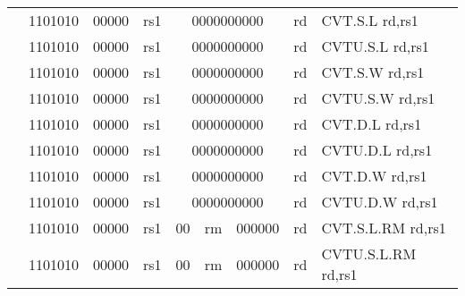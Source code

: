 \begin{table}[p]
\begin{small}
\begin{center}
\begin{tabular}{rcccccccccccl}
&
\multicolumn{2}{|c|}{1101010} &
\multicolumn{1}{c|}{00000} &
\multicolumn{1}{c|}{rs1} &
\multicolumn{6}{c|}{0000000000} &
\multicolumn{1}{c|}{rd} & CVT.S.L rd,rs1 \\
\cline{2-12}
  

&
\multicolumn{2}{|c|}{1101010} &
\multicolumn{1}{c|}{00000} &
\multicolumn{1}{c|}{rs1} &
\multicolumn{6}{c|}{0000000000} &
\multicolumn{1}{c|}{rd} & CVTU.S.L rd,rs1 \\
\cline{2-12}
  

&
\multicolumn{2}{|c|}{1101010} &
\multicolumn{1}{c|}{00000} &
\multicolumn{1}{c|}{rs1} &
\multicolumn{6}{c|}{0000000000} &
\multicolumn{1}{c|}{rd} & CVT.S.W rd,rs1 \\
\cline{2-12}
  

&
\multicolumn{2}{|c|}{1101010} &
\multicolumn{1}{c|}{00000} &
\multicolumn{1}{c|}{rs1} &
\multicolumn{6}{c|}{0000000000} &
\multicolumn{1}{c|}{rd} & CVTU.S.W rd,rs1 \\
\cline{2-12}
  

&
\multicolumn{2}{|c|}{1101010} &
\multicolumn{1}{c|}{00000} &
\multicolumn{1}{c|}{rs1} &
\multicolumn{6}{c|}{0000000000} &
\multicolumn{1}{c|}{rd} & CVT.D.L rd,rs1 \\
\cline{2-12}
  

&
\multicolumn{2}{|c|}{1101010} &
\multicolumn{1}{c|}{00000} &
\multicolumn{1}{c|}{rs1} &
\multicolumn{6}{c|}{0000000000} &
\multicolumn{1}{c|}{rd} & CVTU.D.L rd,rs1 \\
\cline{2-12}
  

&
\multicolumn{2}{|c|}{1101010} &
\multicolumn{1}{c|}{00000} &
\multicolumn{1}{c|}{rs1} &
\multicolumn{6}{c|}{0000000000} &
\multicolumn{1}{c|}{rd} & CVT.D.W rd,rs1 \\
\cline{2-12}
  

&
\multicolumn{2}{|c|}{1101010} &
\multicolumn{1}{c|}{00000} &
\multicolumn{1}{c|}{rs1} &
\multicolumn{6}{c|}{0000000000} &
\multicolumn{1}{c|}{rd} & CVTU.D.W rd,rs1 \\
\cline{2-12}
  

&
\multicolumn{2}{|c|}{1101010} &
\multicolumn{1}{c|}{00000} &
\multicolumn{1}{c|}{rs1} &
\multicolumn{1}{c|}{00} &
\multicolumn{2}{c|}{rm} &
\multicolumn{3}{c|}{000000} &
\multicolumn{1}{c|}{rd} & CVT.S.L.RM rd,rs1 \\
\cline{2-12}
  

&
\multicolumn{2}{|c|}{1101010} &
\multicolumn{1}{c|}{00000} &
\multicolumn{1}{c|}{rs1} &
\multicolumn{1}{c|}{00} &
\multicolumn{2}{c|}{rm} &
\multicolumn{3}{c|}{000000} &
\multicolumn{1}{c|}{rd} & CVTU.S.L.RM rd,rs1 \\
\cline{2-12}
  


\end{tabular}
\end{center}
\end{small}
\end{table}
